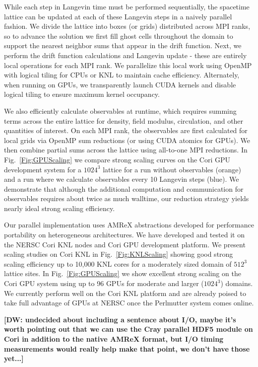 \documentclass[onecolumn, 12pt]{article}
\newcommand{\don}[1]{{\color{blue} \bf[DW: #1]}}
\begin{document}
While each step in Langevin time must be performed sequentially, the spacetime lattice can be updated at each of these Langevin steps in a naively parallel fashion. We divide the lattice into boxes (or grids) distributed across MPI ranks, so to advance the solution we first fill ghost cells throughout the domain to support the nearest neighbor sums that appear in the drift function. Next, we perform the drift function calculations and Langevin update - these are entirely local operations for each MPI rank. We parallelize this local work using OpenMP with logical tiling for CPUs or KNL to maintain cache efficiency. Alternately, when running on GPUs, we transparently launch CUDA kernels and disable logical tiling to ensure maximum kernel occupancy.

We also efficiently calculate observables at runtime, which requires summing terms across the entire lattice for density, field modulus, circulation, and other quantities of interest. On each MPI rank, the observables are first calculated for local grids via OpenMP sum reductions (or using CUDA atomics for GPUs). We then combine partial sums across the lattice using all-to-one MPI reductions. In Fig.~\ref{Fig:GPUScaling} we compare strong scaling curves on the Cori GPU development system for a $1024^3$ lattice for a run without observables (orange) and a run where we calculate observables every 10 Langevin steps (blue). We demonstrate that although the additional computation and communication for observables requires about twice as much walltime, our reduction strategy yields nearly ideal strong scaling efficiency.

Our parallel implementation uses AMReX abstractions developed for performance portability on heterogeneous architectures. We have developed and tested it on the NERSC Cori KNL nodes and Cori GPU development platform. We present scaling studies on Cori KNL in Fig.~\ref{Fig:KNLScaling} showing good strong scaling efficiency up to 10,000 KNL cores for a moderately sized domain of $512^3$ lattice sites. In Fig.~\ref{Fig:GPUScaling} we show excellent strong scaling on the Cori GPU system using up to 96 GPUs for moderate and larger ($1024^3$) domains.  We currently perform well on the Cori KNL platform and are already poised to take full advantage of GPUs at NERSC once the Perlmutter system comes online.

\don{undecided about including a sentence about I/O, maybe it's worth
pointing out that we can use the Cray parallel HDF5 module on Cori in addition
to the native AMReX format, but I/O timing measurements would really help make
that point, we don't have those yet...}
\end{document}
